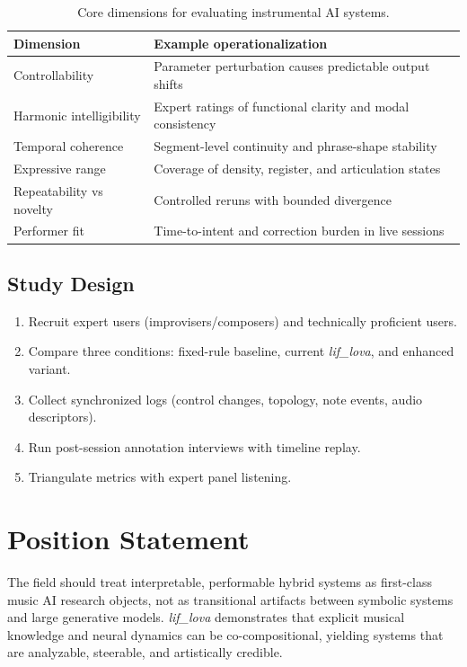 \documentclass[11pt,a4paper]{article}
\begin{document}
\begin{table}[h]
\centering
\begin{tabular}{@{}ll@{}}
\toprule
Dimension & Example operationalization \\
\midrule
Controllability & Parameter perturbation causes predictable output shifts \\
Harmonic intelligibility & Expert ratings of functional clarity and modal consistency \\
Temporal coherence & Segment-level continuity and phrase-shape stability \\
Expressive range & Coverage of density, register, and articulation states \\
Repeatability vs novelty & Controlled reruns with bounded divergence \\
Performer fit & Time-to-intent and correction burden in live sessions \\
\bottomrule
\end{tabular}
\caption{Core dimensions for evaluating instrumental AI systems.}
\end{table}

\subsection{Study Design}

\begin{enumerate}[label=\arabic*.]
    \item Recruit expert users (improvisers/composers) and technically proficient users.
    \item Compare three conditions: fixed-rule baseline, current \textit{lif\_lova}, and enhanced variant.
    \item Collect synchronized logs (control changes, topology, note events, audio descriptors).
    \item Run post-session annotation interviews with timeline replay.
    \item Triangulate metrics with expert panel listening.
\end{enumerate}

\section{Position Statement}

The field should treat interpretable, performable hybrid systems as first-class music AI research objects,
not as transitional artifacts between symbolic systems and large generative models.
\textit{lif\_lova} demonstrates that explicit musical knowledge and neural dynamics can be co-compositional,
yielding systems that are analyzable, steerable, and artistically credible.
\end{document}
